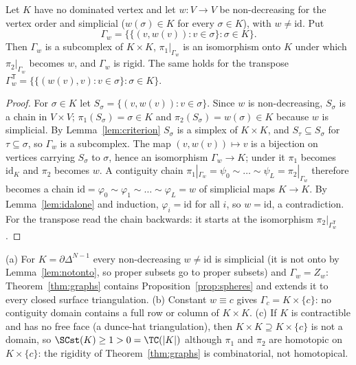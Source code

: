 \begin{theorem}\label{thm:graphs}
Let $K$ have no dominated vertex and let $w:V\to V$ be non-decreasing for the vertex order and simplicial
($w(\sigma)\in K$ for every $\sigma\in K$), with $w\ne\mathrm{id}$.  Put
\[
\Gamma_w=\bigl\{\{(v,w(v)):v\in\sigma\}:\sigma\in K\bigr\}.
\]
Then $\Gamma_w$ is a subcomplex of $K\times K$, $\pi_1|_{\Gamma_w}$ is an isomorphism onto $K$ under which
$\pi_2|_{\Gamma_w}$ becomes $w$, and $\Gamma_w$ is rigid.  The same holds for the transpose
$\Gamma_w^{\mathsf T}=\{\{(w(v),v):v\in\sigma\}:\sigma\in K\}$.
\end{theorem}
\begin{proof}
For $\sigma\in K$ let $S_\sigma=\{(v,w(v)):v\in\sigma\}$.  Since $w$ is non-decreasing, $S_\sigma$ is a chain in
$V\times V$; $\pi_1(S_\sigma)=\sigma\in K$ and $\pi_2(S_\sigma)=w(\sigma)\in K$ because $w$ is simplicial.  By
Lemma~\ref{lem:criterion} $S_\sigma$ is a simplex of $K\times K$, and $S_\tau\subseteq S_\sigma$ for
$\tau\subseteq\sigma$, so $\Gamma_w$ is a subcomplex.  The map $(v,w(v))\mapsto v$ is a bijection on vertices
carrying $S_\sigma$ to $\sigma$, hence an isomorphism $\Gamma_w\to K$; under it $\pi_1$ becomes $\mathrm{id}_K$ and
$\pi_2$ becomes $w$.  A contiguity chain $\pi_1|_{\Gamma_w}=\psi_0\sim\dots\sim\psi_L=\pi_2|_{\Gamma_w}$ therefore
becomes a chain $\mathrm{id}=\varphi_0\sim\varphi_1\sim\dots\sim\varphi_L=w$ of simplicial maps $K\to K$.  By
Lemma~\ref{lem:idalone} and induction, $\varphi_i=\mathrm{id}$ for all $i$, so $w=\mathrm{id}$, a contradiction.
For the transpose read the chain backwards: it starts at the isomorphism $\pi_2|_{\Gamma_w^{\mathsf T}}$.
\end{proof}

\begin{remark}
(a) For $K=\partial\Delta^{N-1}$ every non-decreasing $w\ne\mathrm{id}$ is simplicial (it is not onto by
Lemma~\ref{lem:notonto}, so proper subsets go to proper subsets) and $\Gamma_w=Z_w$: Theorem~\ref{thm:graphs}
contains Proposition~\ref{prop:spheres} and extends it to every closed surface triangulation.
(b) Constant $w\equiv c$ gives $\Gamma_c=K\times\{c\}$: no contiguity domain contains a full row or column of
$K\times K$.
(c) If $K$ is contractible and has no free face (a dunce-hat triangulation), then $K\times K\supseteq K\times\{c\}$
is not a domain, so $\SCst(K)\ge1>0=\TC(|K|)$ although $\pi_1$ and $\pi_2$ are homotopic on $K\times\{c\}$: the
rigidity of Theorem~\ref{thm:graphs} is combinatorial, not homotopical.
\end{remark}

